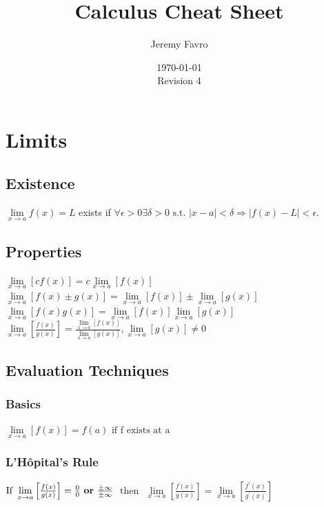 \documentclass[10pt,landscape,letterpaper]{cheatsheet}
\title{Calculus Cheat Sheet}
\author{Jeremy Favro}
\date{\today\\Revision 4}
\begin{document}
\maketitle

\section*{Limits}
\subsection*{Existence}
$\lim\limits_{x\to a}f(x)=L $ exists if $\forall \epsilon > 0 \exists \delta > 0 \text{ s.t. } \left\lvert x-a \right\rvert < \delta \Rightarrow \left\lvert f(x) - L \right\rvert < \epsilon $.
\subsection*{Properties}
$ \lim\limits_{x\to a}[cf(x)]=c\lim\limits_{x\to a}[f(x)] $
$ \lim\limits_{x\to a}[f(x) \pm g(x)]=\lim\limits_{x\to a}[f(x)] \pm \lim\limits_{x\to a}[g(x)] $
$ \lim\limits_{x\to a}[f(x)g(x)]=\lim\limits_{x\to a}[f(x)]\lim\limits_{x\to a}[g(x)] $
$ \lim\limits_{x\to a}\left[\frac{f(x)}{g(x)}\right]=\frac{\lim\limits_{x\to a}[f(x)]}{\lim\limits_{x\to a}[g(x)]}, \lim\limits_{x\to a}[g(x)] \neq 0 $
\subsection*{Evaluation Techniques}

\subsubsection*{Basics}
$ \lim\limits_{x\to a}\left[f(x)\right]=f(a) \text{ if f exists at a } $

\subsubsection*{L'H\^opital's Rule}
$ \text{If } \lim\limits_{x\to a}\left[\frac{f(x)}{g(x)}\right]=\frac{0}{0} \text { \textbf{or} } \frac{\pm \infty}{\pm \infty}$
$ \text{ then } $
$ \lim\limits_{x\to a}\left[\frac{f(x)}{g(x)}\right]=\lim\limits_{x\to a}\left[\frac{f^{\prime}(x)}{g^{\prime}(x)}\right] $

\end{document}
